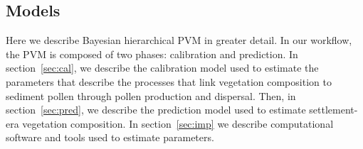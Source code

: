 \documentclass[12pt]{article}
\begin{document}



\subsection{Models}

Here we describe Bayesian hierarchical PVM in greater detail. In our
workflow, the PVM is composed of two phases: calibration and
prediction. In section~\ref{sec:cal}, we describe the calibration
model used to estimate the parameters that describe the processes that
link vegetation composition to sediment pollen through pollen
production and dispersal. Then, in section~\ref{sec:pred}, we describe
the prediction model used to estimate settlement-era vegetation
composition. In section~\ref{sec:imp} we describe computational
software and tools used to estimate parameters.
\end{document}
